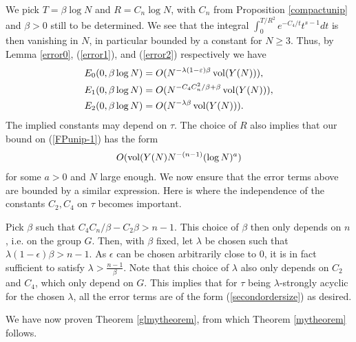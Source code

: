 We pick $T=\beta \log N$ and $R=C_n\log N$, with $C_n$ from Proposition \ref{compactunip} and $\beta>0$ still to be determined. We see that the integral $\int_0^{T/R^2}e^{-C_4/t}t^{s-1}dt$ is then vanishing in $N$, in particular bounded by a constant for $N\geq 3$. Thus, by Lemma \ref{error0}, (\ref{error1}), and (\ref{error2}) respectively we have
\begin{align*}
    E_0(0,\beta\log N) &= O( N^{-\lambda(1-\varepsilon)\beta}\operatorname{vol}(Y(N))),\\
    E_1(0,\beta\log N) &= O( N^{-C_4C_n^2/\beta +\beta}\operatorname{vol}(Y(N))),\\
    E_2(0,\beta\log N) &= O( N^{-\lambda\beta}\operatorname{vol}(Y(N))).
\end{align*}
The implied constants may depend on $\tau$. The choice of $R$ also implies that our bound on (\ref{FPunip-1}) has the form
\begin{align}\label{secondordersize}
    O(\operatorname{vol}(Y(N)N^{-(n-1)}(\log N)^a)
\end{align}
for some $a>0$ and $N$ large enough. We now ensure that the error terms above are bounded by a similar expression. Here is where the independence of the constants $C_2,C_4$ on $\tau$ becomes important. 

Pick $\beta$ such that $C_4C_n/\beta-C_2\beta>n-1$. This choice of $\beta$ then only depends on $n$, i.e. on the group $G$. Then, with $\beta$ fixed, let $\lambda$ be chosen such that $\lambda(1-\epsilon)\beta>n-1$. As $\epsilon$ can be chosen arbitrarily close to $0$, it is in fact sufficient to satisfy $\lambda>\frac{n-1}{\beta}$. Note that this choice of $\lambda$ also only depends on $C_2$ and $C_4$, which only depend on $G$. This implies that for $\tau$ being $\lambda$-strongly acyclic for the chosen $\lambda$, all the error terms are of the form (\ref{secondordersize}) as desired.

We have now proven Theorem \ref{glmytheorem}, from which Theorem \ref{mytheorem} follows.

\vspace{15em}